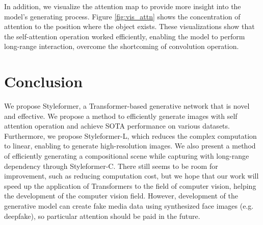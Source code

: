 \documentclass[10pt,twocolumn,letterpaper]{article}
\begin{document}
In addition, we visualize the attention map to provide more insight into the model's generating process. Figure \ref{fig:vis_attn} shows the concentration of attention to the position where the object exists. These visualizations show that the self-attention operation worked efficiently, enabling the model to perform long-range interaction, overcome the shortcoming of convolution operation.


























































\section{Conclusion}
\label{sec:con}
We propose Styleformer, a Transformer-based generative network that is novel and effective. We propose a method to efficiently generate images with self attention operation and achieve SOTA performance on various datasets. Furthermore, we propose Styleformer-L, which reduces the complex computation to linear, enabling to generate high-resolution images. We also present a method of efficiently generating a compositional scene while capturing with long-range dependency through Styleformer-C. 
There still seems to be room for improvement, such as reducing computation cost, but we hope that our work will speed up the application of Transformers to the field of computer vision, helping the development of the computer vision field. However, development of the generative model can create fake media data using synthesized face images (e.g. deepfake), so particular attention should be paid in the future.
\end{document}
